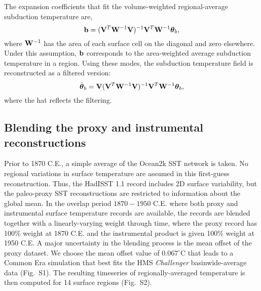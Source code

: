 \documentclass[12pt]{article}
\begin{document}
The expansion coefficients that fit the volume-weighted regional-average subduction temperature are,
\begin{equation}
{\bf b} = ({\bf V}^T {\bf W}^{-1} {\bf V})^{-1} {\bf V}^T{\bf W}^{-1} {\boldsymbol \theta}_b,
\end{equation}
where ${\bf W}^{-1}$ has the area of each surface cell on the diagonal and zero elsewhere. Under this assumption, ${\bf b}$ corresponds to the area-weighted average subduction temperature in a region. Using these modes, the subduction temperature field is reconstructed as a filtered version:
\begin{equation}
{\hat {\boldsymbol \theta}_b} = {\bf V} ({\bf V}^T {\bf W}^{-1} {\bf V})^{-1} {\bf V}^T{\bf W}^{-1} {\boldsymbol \theta}_b,
\end{equation}
where the hat reflects the filtering.


\subsection{Blending the proxy and instrumental reconstructions}

Prior to 1870 C.E., a simple average of the Ocean2k SST network
\cite{Mcgregor-2015:Robust} is taken. No regional variations in
surface temperature are assumed in this first-guess reconstruction.
Thus, the HadISST 1.1 record includes 2D surface variability, but the
paleo-proxy SST reconstructions are restricted to information about
the global mean.  In the overlap period $1870-1950$ C.E. where both
proxy and instrumental surface temperature records are available, the
records are blended together with a linearly-varying weight through
time, where the proxy record has 100\% weight at 1870 C.E. and the
instrumental product is given 100\% weight at 1950 C.E. A major
uncertainty in the blending process is the mean offset of the proxy
dataset. We choose the mean offset value of $0.067^{\circ}$C that leads to a Common Era
simulation that best fits the HMS {\it Challenger} basinwide-average
data (Fig.~S1). The resulting timeseries of regionally-averaged
temperature is then computed for 14 surface regions (Fig.~S2).


\end{document}
